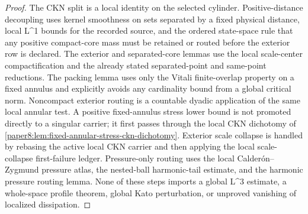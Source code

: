 \documentclass[11pt]{amsart}
\def\({}%
\def\){}%
\theoremstyle{plain}
\theoremstyle{definition}
\theoremstyle{remark}
\begin{document}
\begin{proof}
The CKN split is a local identity on the selected cylinder.  Positive-distance
decoupling uses kernel smoothness on sets separated by a fixed physical
distance, local \(L^1\) bounds for the recorded source, and the ordered
state-space rule that any positive compact-core mass must be retained or routed
before the exterior row is declared.  The exterior and separated-core lemmas use
the local scale-center compactification and the already stated separated-point
and same-point reductions.  The packing lemma uses only the Vitali
finite-overlap property on a fixed annulus and explicitly avoids any cardinality
bound from a global critical norm.  Noncompact exterior routing is a countable
dyadic application of the same local annular test.  A positive fixed-annulus
stress lower bound is not promoted directly to a singular carrier; it first
passes through the local CKN dichotomy of
\cref{paper8:lem:fixed-annular-stress-ckn-dichotomy}.  Exterior scale collapse
is handled by rebasing the active local CKN carrier and then applying the local
scale-collapse first-failure ledger.  Pressure-only routing uses the local
Calder\'on--Zygmund pressure atlas, the nested-ball harmonic-tail estimate, and
the harmonic pressure routing lemma.  None of these steps imports a global
\(L^3\) estimate, a whole-space profile theorem, global Kato perturbation, or
unproved vanishing of localized dissipation.
\end{proof}
\end{document}
